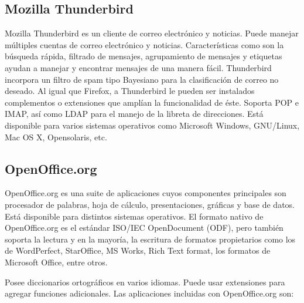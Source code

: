 \subsection{Mozilla Thunderbird}
\label{sec:thunderbird}

Mozilla Thunderbird es un cliente de correo electrónico y noticias. Puede manejar múltiples cuentas de correo electrónico y noticias. Características como son la búsqueda rápida, filtrado de mensajes, agrupamiento de mensajes y etiquetas ayudan a manejar y encontrar mensajes de una manera fácil. Thunderbird incorpora un filtro de spam tipo Bayesiano para la clasificación de correo no deseado. Al igual que Firefox, a Thunderbird le pueden ser instalados complementos o extensiones que amplían la funcionalidad de éste. Soporta POP e IMAP, así como LDAP para el manejo de la libreta de direcciones. Está disponible para varios sistemas operativos como Microsoft Windows, GNU/Linux, Mac OS X, Opensolaris, etc.

\subsection{OpenOffice.org}
\label{sec:openoffice}

OpenOffice.org es una suite de aplicaciones cuyos componentes principales son procesador de palabras, hoja de cálculo, presentaciones, gráficas y base de datos. Está disponible para distintos sistemas operativos. El formato nativo de OpenOffice.org es el estándar ISO/IEC OpenDocument (ODF), pero también soporta la lectura y en la mayoría, la escritura de formatos propietarios como los de WordPerfect, StarOffice, MS Works, Rich Text format, los formatos de Microsoft Office, entre otros.

Posee diccionarios ortográficos en varios idiomas. Puede usar extensiones para agregar funciones adicionales. Las aplicaciones incluidas con OpenOffice.org son:

